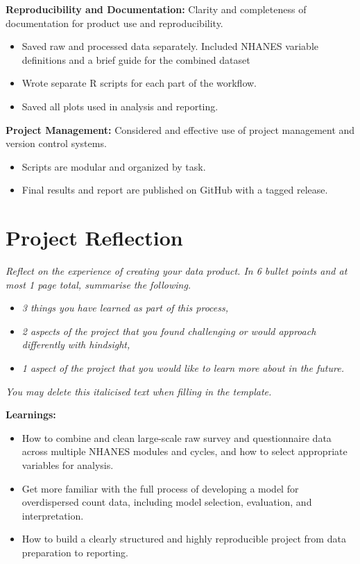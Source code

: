 \documentclass[a4paper, 12pt]{article}
\begin{document}
\textbf{Reproducibility and Documentation:} Clarity and completeness of documentation for product use and reproducibility.

\begin{itemize}
    \item Saved raw and processed data separately. Included NHANES variable definitions and a brief guide for the combined dataset
    \item Wrote separate R scripts for each part of the workflow.
    \item Saved all plots used in analysis and reporting.
\end{itemize}

\textbf{Project Management:} Considered and effective use of project management and version control systems.

\begin{itemize}
    \item Scripts are modular and organized by task.
    \item Final results and report are published on GitHub with a tagged release.
\end{itemize}

\pagebreak

\section{Project Reflection}

\textit{Reflect on the experience of creating your data product. In 6 bullet points and at most 1 page total, summarise the following.} 

\begin{itemize}
    \item \textit{3 things you have learned as part of this process,}
    \item \textit{2 aspects of the project that you found challenging or would approach differently with hindsight,} 
    \item \textit{1 aspect of the project that you would like to learn more about in the future.}
\end{itemize}

\textit{You may delete this italicised text when filling in the template.} 

\textbf{Learnings:}

\begin{itemize}
    \item How to combine and clean large-scale raw survey and questionnaire data across multiple NHANES modules and cycles, and how to select appropriate variables for analysis.
    \item Get more familiar with the full process of developing a model for overdispersed count data, including model selection, evaluation, and interpretation.
    \item How to build a clearly structured and highly reproducible project from data preparation to reporting.
\end{itemize}
\end{document}
